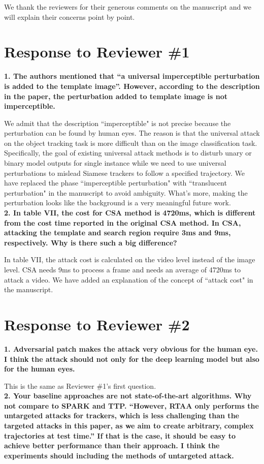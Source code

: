 \documentclass{article}
\begin{document}
\noindent We thank the reviewers for their generous comments on the manuscript and we will explain their concerns point by point.

\section*{Response to Reviewer \#1}

\textbf{1. The authors mentioned that “a universal imperceptible perturbation is added to the template image”. However, according to the description in the paper, the perturbation added to template image is not imperceptible.}

We admit that the description “imperceptible" is not precise because the perturbation can be found by human eyes. The reason is that the universal attack on the object tracking task is more difficult than on the image classification task. Specifically, the goal of existing universal attack methods is to disturb unary or binary model outputs for single instance while we need to use universal perturbations to mislead Siamese trackers to follow a specified trajectory. 
We have replaced the phase ``imperceptible perturbation" with ``translucent perturbation" \cite{zolfi2021translucent} in the manuscript to avoid ambiguity.
What's more, making the perturbation looks like the background is a very meaningful future work.
\\[6pt]
\noindent \textbf{2. In table VII, the cost for CSA method is 4720ms, which is different from the cost time reported in the original CSA method. In CSA, attacking the template and search region require 3ms and 9ms, respectively. Why is there such a big difference?}

In table VII, the attack cost is calculated on the video level instead of the image level. CSA needs 9ms to process a frame and needs an average of 4720ms to attack a video. We have added an explanation of the concept of ``attack cost" in the manuscript.

\section*{Response to Reviewer \#2}
\textbf{1. Adversarial patch makes the attack very obvious for the human eye. I think the attack should not only for the deep learning model but also for the human eyes.}

This is the same as Reviewer \#1's first question.
\\[6pt]
\noindent \textbf{2. Your baseline approaches are not state-of-the-art algorithms. Why not compare to SPARK and TTP. “However, RTAA only performs the untargeted attacks for trackers, which is less challenging than the targeted attacks in this paper, as we aim to create arbitrary, complex trajectories at test time.” If that is the case, it should be easy to achieve better performance than their approach. I think the experiments should including the methods of untargeted attack.}
\end{document}
